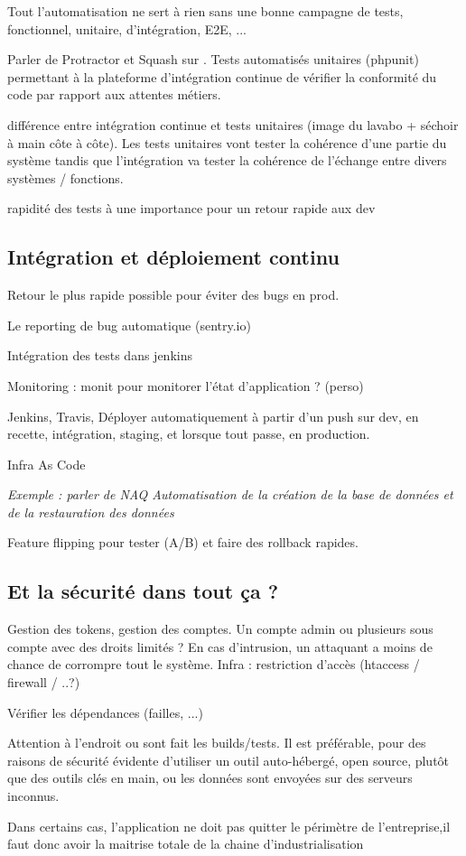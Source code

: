 
Tout l'automatisation ne sert à rien sans une bonne campagne de tests, fonctionnel, unitaire, d'intégration, E2E, ...

Parler de Protractor et Squash sur \bv. Tests automatisés unitaires (phpunit) permettant à la plateforme d'intégration continue de vérifier la conformité du code par rapport aux attentes métiers.

différence entre intégration continue et tests unitaires (image du lavabo + séchoir à main côte à côte). Les tests unitaires vont tester la cohérence d'une partie du système tandis que l'intégration va tester la cohérence de l'échange entre divers systèmes / fonctions.

rapidité des tests à une importance pour un retour rapide aux dev

\subsection{Intégration et déploiement continu}


Retour le plus rapide possible pour éviter des bugs en prod. 

Le reporting de bug automatique (sentry.io)

Intégration des tests dans jenkins

Monitoring : monit pour monitorer l'état d'application ? (perso)

Jenkins, Travis, Déployer automatiquement à partir d'un push sur dev, en recette, intégration, staging, et lorsque tout passe, en production.

Infra As Code %

\textit{Exemple : parler de NAQ Automatisation de la création de la base de données et de la restauration des données}

Feature flipping pour tester (A/B) et faire des rollback rapides.

\subsection{Et la sécurité dans tout ça ?}


Gestion des tokens, gestion des comptes.
Un compte admin ou plusieurs sous compte avec des droits limités ? En cas d'intrusion, un attaquant a moins de chance de corrompre tout le système.
Infra : restriction d'accès (htaccess / firewall / ..?)

Vérifier les dépendances (failles, ...)

Attention à l'endroit ou sont fait les builds/tests. Il est préférable, pour des raisons de sécurité évidente d'utiliser un outil auto-hébergé, open source, plutôt que des outils clés en main, ou les données sont envoyées sur des serveurs inconnus. 

Dans certains cas, l'application ne doit pas quitter le périmètre de l'entreprise,il faut donc avoir la maitrise totale de la chaine d'industrialisation
